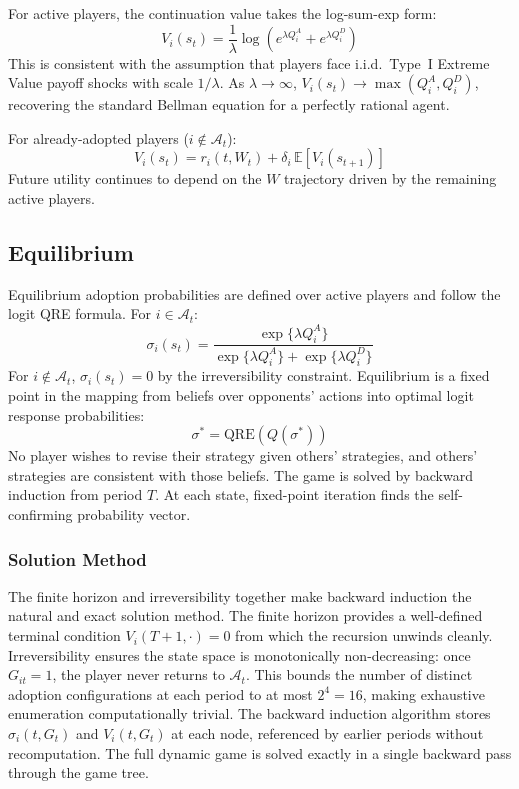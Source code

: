 \documentclass[10pt,a4paper]{article}
\begin{document}
For active players, the continuation value takes the log-sum-exp form:
\[
V_i(s_t) = \frac{1}{\lambda} \log\!\left(e^{\lambda Q_i^A} + e^{\lambda Q_i^D}\right)
\]
This is consistent with the assumption that players face i.i.d.\ Type~I Extreme Value payoff
shocks with scale $1/\lambda$. As $\lambda \to \infty$, $V_i(s_t) \to \max(Q_i^A, Q_i^D)$,
recovering the standard Bellman equation for a perfectly rational agent.

For already-adopted players ($i \notin \mathcal{A}_t$):
\[
V_i(s_t) = r_i(t, W_t) + \delta_i\, \mathbb{E}[V_i(s_{t+1})]
\]
Future utility continues to depend on the $W$ trajectory driven by the remaining active players.

\needspace{12em}
\subsection*{Equilibrium}

Equilibrium adoption probabilities are defined over active players and follow the logit QRE
formula. For $i \in \mathcal{A}_t$:
\[
\sigma_i(s_t) = \frac{\exp\{\lambda Q_i^A\}}{\exp\{\lambda Q_i^A\} + \exp\{\lambda Q_i^D\}}
\]
For $i \notin \mathcal{A}_t$, $\sigma_i(s_t) = 0$ by the irreversibility constraint.
Equilibrium is a fixed point in the mapping from beliefs over opponents' actions into optimal
logit response probabilities:
\[
\sigma^* = \mathrm{QRE}(Q(\sigma^*))
\]
No player wishes to revise their strategy given others' strategies, and others' strategies are
consistent with those beliefs. The game is solved by backward induction from period $T$. At
each state, fixed-point iteration finds the self-confirming probability vector.

\subsubsection*{Solution Method}

The finite horizon and irreversibility together make backward induction the natural and exact
solution method. The finite horizon provides a well-defined terminal condition $V_i(T+1,\cdot)=0$
from which the recursion unwinds cleanly. Irreversibility ensures the state space is
monotonically non-decreasing: once $G_{it}=1$, the player never returns to $\mathcal{A}_t$.
This bounds the number of distinct adoption configurations at each period to at most $2^4 = 16$,
making exhaustive enumeration computationally trivial. The backward induction algorithm stores
$\sigma_i(t, G_t)$ and $V_i(t, G_t)$ at each node, referenced by earlier periods without
recomputation. The full dynamic game is solved exactly in a single backward pass through the
game tree.
\end{document}

